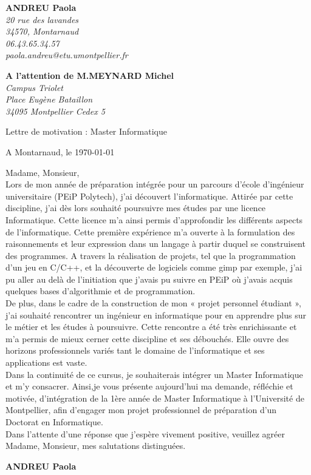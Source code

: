 \documentclass[11pt]{letter}
\begin{document}
 \sffamily
 \hfill
 \begin{flushleft}
 {\bfseries ANDREU Paola}\\[.35ex]
 \small\itshape
 20 rue des lavandes\\
 34570, Montarnaud\\[.35ex]
 06.43.65.34.57\\
 paola.andreu@etu.umontpellier.fr
 \end{flushleft}
 \begin{flushright}
 {\bfseries A l'attention de M.MEYNARD Michel}\\[.35ex]
 \small\itshape
 Campus Triolet\\
Place Eugène Bataillon\\
34095 Montpellier Cedex 5\\
 \end{flushright}
 
 \begin{center}
 Lettre de motivation : Master Informatique\\
 \end{center}
 
 \begin{flushright}
 A Montarnaud, le \today \\
 \end{flushright}
 Madame, Monsieur,\\
 
Lors de mon année de préparation intégrée pour un parcours d'école d'ingénieur universitaire (PEiP Polytech), j’ai découvert l'informatique. Attirée par cette discipline, j'ai dès lors souhaité poursuivre mes études par une licence Informatique. Cette licence m’a ainsi permis d'approfondir les différents aspects de l'informatique. Cette première expérience m’a ouverte à la formulation des raisonnements et leur expression dans un langage à partir duquel se construisent des programmes. A travers la réalisation de projets, tel que la programmation d'un jeu en C/C++, et la découverte de logiciels comme gimp par exemple, j’ai pu aller au delà de l’initiation que j’avais pu suivre en PEiP où j'avais acquis quelques bases d’algorithmie et de programmation.\\
De plus, dans le cadre de la construction de mon « projet personnel étudiant », j’ai souhaité rencontrer un ingénieur en informatique pour en apprendre plus sur le métier et les études à poursuivre. Cette rencontre a été très enrichissante et m’a permis de mieux cerner cette discipline et ses débouchés. Elle ouvre des horizons professionnels variés tant le domaine de l’informatique et ses applications est vaste.\\
Dans la continuité de ce cursus, je souhaiterais intégrer un Master Informatique et m’y consacrer. Ainsi,je vous présente aujourd’hui ma demande, réfléchie et motivée, d’intégration de la 1ère année de Master Informatique à l’Université de Montpellier, afin d’engager mon projet professionnel de préparation d’un Doctorat en Informatique.\\

Dans l’attente d’une réponse que j’espère vivement positive, veuillez agréer Madame, Monsieur, mes salutations distinguées.\\
 \begin{center}
 {\bfseries ANDREU Paola}\\
 \end{center}
 \vfill
 
\end{document}
